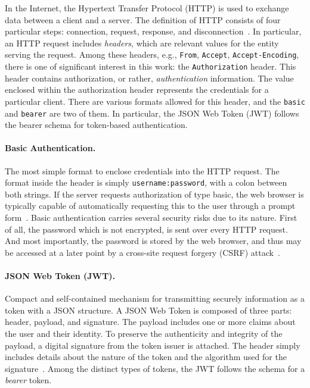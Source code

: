 \documentclass[12pt]{article}
\begin{document}
In the Internet, the Hypertext Transfer Protocol (HTTP) is used to exchange data between a client and a server. The definition of HTTP consists of four particular steps: connection, request, response, and disconnection~\cite{RFC2616}. In particular, an HTTP request includes \emph{headers}, which are relevant values for the entity serving the request. Among these headers, e.g., \texttt{From}, \texttt{Accept}, \texttt{Accept-Encoding}, there is one of significant interest in this work: the \texttt{Authorization} header. This header contains authorization, or rather, \emph{authentication} information. The value enclosed within the authorization header represents the credentials for a particular client. There are various formats allowed for this header, and the \texttt{basic} and \texttt{bearer} are two of them. In particular, the JSON Web Token (JWT) follows the bearer schema for token-based authentication.

\paragraph{Basic Authentication.} The most simple format to enclose credentials into the HTTP request. The format inside the header is simply \texttt{username:password}, with a colon between both strings. If the server requests authorization of type basic, the web browser is typically capable of automatically requesting this to the user through a prompt form~\cite{RFC7617}. Basic authentication carries several security risks due to its nature. First of all, the password which is not encrypted, is sent over every HTTP request. And most importantly, the password is stored by the web browser, and thus may be accessed at a later point by a cross-site request forgery (CSRF) attack~\cite{basic_01}.

\paragraph{JSON Web Token (JWT).} Compact and self-contained mechanism for transmitting securely information as a token with a JSON structure. A JSON Web Token is composed of three parts: header, payload, and signature. The payload includes one or more claims about the user and their identity. To preserve the authenticity and integrity of the payload, a digital signature from the token issuer is attached. The header simply includes details about the nature of the token and the algorithm used for the signature~\cite{RFC7519}. Among the distinct types of tokens, the JWT follows the schema for a \emph{bearer} token. 
\end{document}
